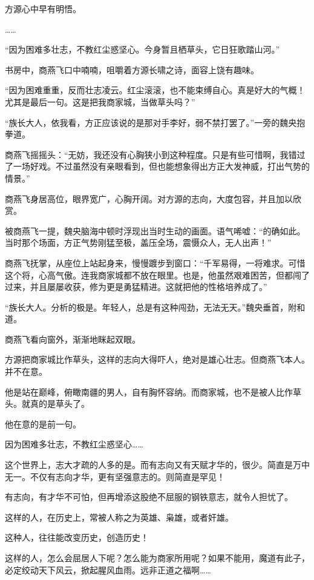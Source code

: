\begin{this_body}
方源心中早有明悟。

……

“因为困难多壮志，不教红尘惑坚心。今身暂且栖草头，它日狂歌踏山河。”

书房中，商燕飞口中喃喃，咀嚼着方源长啸之诗，面容上饶有趣味。

“因为困难重重，反而壮志凌云。红尘滚滚，也不能束缚自心。真是好大的气概！尤其是最后一句。这是把我商家城，当做草头吗？”

“族长大人，依我看，方正应该说的是那对手李好，弱不禁打罢了。”一旁的魏央抱拳道。

商燕飞摇摇头：“无妨，我还没有心胸狭小到这种程度。只是有些可惜啊，我错过了一场好戏。不过虽然没有亲眼看到，但也能想象得出方正大发神威，打出气势的情景。”

商燕飞身居高位，眼界宽广，心胸开阔。对方源的志向，大度包容，并且加以欣赏。

被商燕飞一提，魏央脑海中顿时浮现出当时生动的画面。语气唏嘘：“的确如此。当时那个场面，方正气势刚猛至极，盖压全场，震慑众人，无人出声！”

商燕飞抚掌，从座位上站起身来，慢慢踱步到窗口：“千军易得，一将难求。可惜这个将，心高气傲。连我商家城都不放在眼里。也是，他虽然艰难困苦，但都闯了过来，并且屡屡收获，修为更是勇猛精进。这就把他的性格培养成了。”

“族长大人。分析的极是。年轻人，总是有这种闯劲，无法无天。”魏央垂首，附和道。

商燕飞看向窗外，渐渐地眯起双眼。

方源把商家城比作草头，这样的志向大得吓人，绝对是雄心壮志。但商燕飞本人。并不在意。

他是站在巅峰，俯瞰南疆的男人，自有胸怀容纳。而商家城，也不是被人比作草头。就真的是草头了。

他在意的是前一句。

因为困难多壮志，不教红尘惑坚心……

这个世界上，志大才疏的人多的是。而有志向又有天赋才华的，很少。简直是万中无一。不仅有志向才华，更有坚强意志的。则简直是罕见！

有志向，有才华不可怕，但再增添这股绝不屈服的钢铁意志，就令人担忧了。

这样的人，在历史上，常被人称之为英雄、枭雄，或者奸雄。

这种人，往往能改变历史，创造历史！

这样的人，怎么会屈居人下呢？怎么能为商家所用呢？如果不能用，魔道有此子，必定绞动天下风云，掀起腥风血雨。远非正道之福啊……


\end{this_body}
